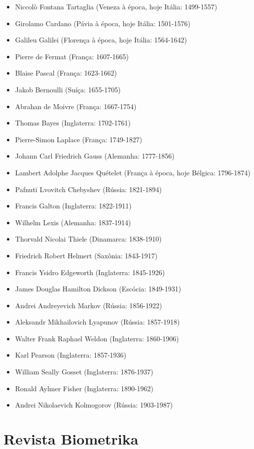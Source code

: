 \documentclass[
]{book}
\providecommand{\tightlist}{%
  \setlength{\itemsep}{0pt}\setlength{\parskip}{0pt}}
\begin{document}
\begin{itemize}
\tightlist
\item
  Niccolò Fontana Tartaglia (Veneza à época, hoje Itália: 1499-1557)
\item
  Girolamo Cardano (Pávia à época, hoje Itália: 1501-1576)
\item
  Galileu Galilei (Florença à época, hoje Itália: 1564-1642)
\item
  Pierre de Fermat (França: 1607-1665)
\item
  Blaise Pascal (França: 1623-1662)
\item
  Jakob Bernoulli (Suíça: 1655-1705)
\item
  Abrahan de Moivre (França: 1667-1754)
\item
  Thomas Bayes (Inglaterra: 1702-1761)
\item
  Pierre-Simon Laplace (França: 1749-1827)
\item
  Johann Carl Friedrich Gauss (Alemanha: 1777-1856)
\item
  Lambert Adolphe Jacques Quételet (França à época, hoje Bélgica: 1796-1874)
\item
  Pafnuti Lvovitch Chebyshev (Rússia: 1821-1894)
\item
  Francis Galton (Inglaterra: 1822-1911)
\item
  Wilhelm Lexis (Alemanha: 1837-1914)
\item
  Thorvald Nicolai Thiele (Dinamarca: 1838-1910)
\item
  Friedrich Robert Helmert (Saxônia: 1843-1917)
\item
  Francis Ysidro Edgeworth (Inglaterra: 1845-1926)
\item
  James Douglas Hamilton Dickson (Escócia: 1849-1931)
\item
  Andrei Andreyevich Markov (Rússia: 1856-1922)
\item
  Aleksandr Mikhailovich Lyapunov (Rússia: 1857-1918)
\item
  Walter Frank Raphael Weldon (Inglaterra: 1860-1906)
\item
  Karl Pearson (Inglaterra: 1857-1936)
\item
  William Seally Gosset (Inglaterra: 1876-1937)
\item
  Ronald Aylmer Fisher (Inglaterra: 1890-1962)
\item
  Andrei Nikolaevich Kolmogorov (Rússia: 1903-1987)
\end{itemize}

\hypertarget{revista-biometrika}{%
\section{Revista Biometrika}\label{revista-biometrika}}
\end{document}
